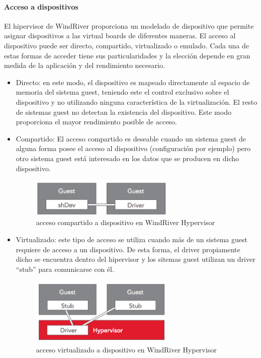 \paragraph{Acceso a dispositivos}
El hipervisor de WindRiver proporciona un modelado de dispositivo que permite asignar dispositivos a las virtual boards de diferentes maneras. El acceso al dispositivo puede ser directo, compartido, virtualizado o emulado. Cada una de estas formas de acceder tiene sus particularidades y la elección depende en gran medida de la aplicación y del rendimiento necesario.

\begin{itemize}
  \item Directo: en este modo, el dispositivo es mapeado directamente al espacio de memoria del sistema guest, teniendo este el control exclusivo sobre el dispositivo y no utilizando ninguna característica de la virtualización. El resto de sistemas guest no detectan la existencia del dispositivo. Este modo proporciona el mayor rendimiento posible de acceso.

  \item Compartido: El acceso compartido es deseable cuando un sistema guest de alguna forma posee el acceso al dispositivo (configuración por ejemplo) pero otro sistema guest está interesado en los datos que se producen en dicho dispositivo.
  \begin{figure}[!htb]
  	\centering
  	\includegraphics[width=0.65\textwidth]{recursos/windriver_drv_1.png}
  	\caption{acceso compartido a dispositivo en WindRiver Hypervisor}
  	\label{fig:windriver_drv_1}
  \end{figure}

  \item Virtualizado: este tipo de acceso se utiliza cuando más de un sistema guest requiere de acceso a un dispositivo. De esta forma, el driver propiamente dicho se encuentra dentro del hipervisor y los sitemas guest utilizan un driver ``stub'' para comunicarse con él.
  \begin{figure}[!htb]
  	\centering
  	\includegraphics[width=0.65\textwidth]{recursos/windriver_drv_2.png}
  	\caption{acceso virtualizado a dispositivo en WindRiver Hypervisor}
  	\label{fig:windriver_drv_2}
  \end{figure}


\end{itemize}

